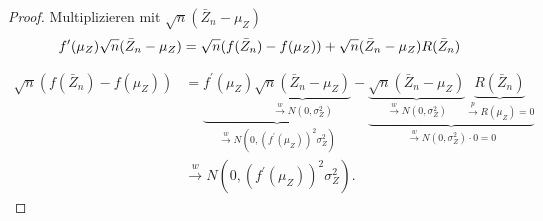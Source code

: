 \documentclass{tstextbook}
\begin{document}
\begin{proof}
	Multiplizieren mit $\sqrt{n}(\bar{Z}_n- \mu_Z)$
	\[
	f^\prime(\mu_Z) \sqrt{n} (\bar{Z}_n-\mu_Z)= \sqrt{n} (f(\bar{Z}_n)-f(\mu_Z) ) + \sqrt{n} (\bar{Z}_n-\mu_Z)R(\bar{Z}_n) \\
	\]
	
	\[
	\begin{aligned}
		\sqrt{n} \left(f(\bar{Z}_n)-f(\mu_Z)\right) & = \underbrace{f^\prime(\mu_Z)\underbrace{\sqrt{n}\left(\bar{Z}_n-\mu_Z\right)}_{\xrightarrow{w}N(0,\sigma_Z^2)}}_{\xrightarrow{w}N\left(0,(f^\prime(\mu_Z))^2\sigma_Z^2\right)} - \underbrace{\underbrace{\sqrt{n}(\bar{Z}_n-\mu_Z)}_{\xrightarrow{w}N(0,\sigma_Z^2)}\underbrace{R(\bar{Z}_n)}_{\xrightarrow{p}R(\mu_Z)=0}}_{\xrightarrow{w}N(0,\sigma_Z^2)\cdot 0 = 0} \\
		&  \xrightarrow{w} N\left(0, (f^\prime(\mu_Z))^2\sigma_Z^2\right).
	\end{aligned}
	\]
	
\end{proof}
 
 \newpage
\end{document}
